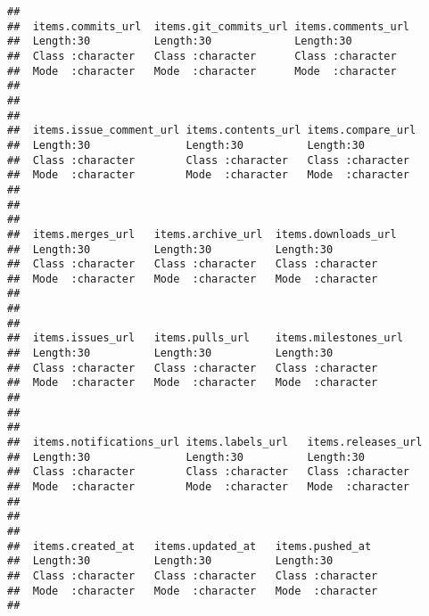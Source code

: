 \documentclass{article}\usepackage[]{graphicx}\usepackage[]{color}
\makeatletter
\newenvironment{kframe}{%
 \def\at@end@of@kframe{}%
 \ifinner\ifhmode%
  \def\at@end@of@kframe{\end{minipage}}%
  \begin{minipage}{\columnwidth}%
 \fi\fi%
 \def\FrameCommand##1{\hskip\@totalleftmargin \hskip-\fboxsep
 \colorbox{shadecolor}{##1}\hskip-\fboxsep
     \hskip-\linewidth \hskip-\@totalleftmargin \hskip\columnwidth}%
 \MakeFramed {\advance\hsize-\width
   \@totalleftmargin\z@ \linewidth\hsize
   \@setminipage}}%
 {\par\unskip\endMakeFramed%
 \at@end@of@kframe}
\newenvironment{knitrout}{}{} %
\makeatother
\begin{document}
\begin{knitrout}
\begin{kframe}
\begin{verbatim}
##                                                                     
##  items.commits_url  items.git_commits_url items.comments_url
##  Length:30          Length:30             Length:30         
##  Class :character   Class :character      Class :character  
##  Mode  :character   Mode  :character      Mode  :character  
##                                                             
##                                                             
##                                                             
##  items.issue_comment_url items.contents_url items.compare_url 
##  Length:30               Length:30          Length:30         
##  Class :character        Class :character   Class :character  
##  Mode  :character        Mode  :character   Mode  :character  
##                                                               
##                                                               
##                                                               
##  items.merges_url   items.archive_url  items.downloads_url
##  Length:30          Length:30          Length:30          
##  Class :character   Class :character   Class :character   
##  Mode  :character   Mode  :character   Mode  :character   
##                                                           
##                                                           
##                                                           
##  items.issues_url   items.pulls_url    items.milestones_url
##  Length:30          Length:30          Length:30           
##  Class :character   Class :character   Class :character    
##  Mode  :character   Mode  :character   Mode  :character    
##                                                            
##                                                            
##                                                            
##  items.notifications_url items.labels_url   items.releases_url
##  Length:30               Length:30          Length:30         
##  Class :character        Class :character   Class :character  
##  Mode  :character        Mode  :character   Mode  :character  
##                                                               
##                                                               
##                                                               
##  items.created_at   items.updated_at   items.pushed_at   
##  Length:30          Length:30          Length:30         
##  Class :character   Class :character   Class :character  
##  Mode  :character   Mode  :character   Mode  :character  
##                                                          

\end{verbatim}
\end{kframe}
\end{knitrout}
\end{document}
